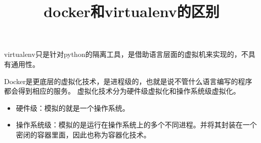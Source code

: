 \documentclass{article}
\title{docker和virtualenv的区别}
\begin{document}
\maketitle
virtualenv只是针对python的隔离工具，是借助语言层面的虚拟机来实现的，\large{不具有通用性}。

\mbox{}

\normalsize Docker是更底层的虚拟化技术，是进程级的，也就是说\large{不管什么语言}\normalsize{编写的程序}\large{都会}\normalsize{得到相应的}\large{服务}。
\normalsize 虚拟化技术分为\large{硬件级}\normalsize{虚拟化和}\large{操作系统}\normalsize{级虚拟化}。
\begin{itemize}
    \item 硬件级：模拟的就是一个操作系统。
    \item 操作系统级：模拟的是运行在操作系统上的多个不同进程。并将其封装在一个密闭的容器里面，因此也称为容器化技术。
\end{itemize}
\end{document}
